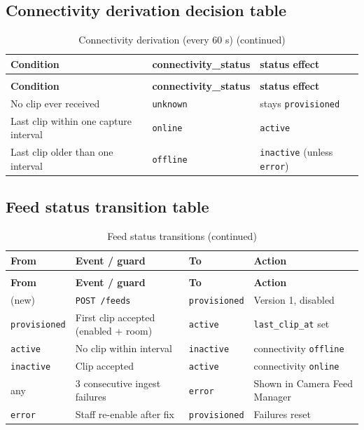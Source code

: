 \subsection{Connectivity derivation decision table}
\begin{longtable}{L{6.4cm}L{3.0cm}L{5.0cm}}
\caption{Connectivity derivation (every 60 s)}\label{tab:c1-dt-conn}\\
\toprule
\textbf{Condition} & \textbf{connectivity\_status} & \textbf{status effect} \\
\midrule
\endfirsthead
\caption[]{Connectivity derivation (every 60 s) (continued)}\\
\toprule
\textbf{Condition} & \textbf{connectivity\_status} & \textbf{status effect} \\
\midrule
\endhead
No clip ever received & \texttt{unknown} & stays \texttt{provisioned} \\
Last clip within one capture interval & \texttt{online} & \texttt{active} \\
Last clip older than one interval & \texttt{offline} & \texttt{inactive} (unless \texttt{error}) \\
\bottomrule
\end{longtable}

\subsection{Feed status transition table}
\begin{longtable}{L{2.6cm}L{5.4cm}L{2.4cm}L{4.2cm}}
\caption{Feed status transitions}\label{tab:c1-dt-state}\\
\toprule
\textbf{From} & \textbf{Event / guard} & \textbf{To} & \textbf{Action} \\
\midrule
\endfirsthead
\caption[]{Feed status transitions (continued)}\\
\toprule
\textbf{From} & \textbf{Event / guard} & \textbf{To} & \textbf{Action} \\
\midrule
\endhead
(new) & \texttt{POST /feeds} & \texttt{provisioned} & Version 1, disabled \\
\texttt{provisioned} & First clip accepted (enabled + room) & \texttt{active} & \texttt{last\_clip\_at} set \\
\texttt{active} & No clip within interval & \texttt{inactive} & connectivity \texttt{offline} \\
\texttt{inactive} & Clip accepted & \texttt{active} & connectivity \texttt{online} \\
any & 3 consecutive ingest failures & \texttt{error} & Shown in Camera Feed Manager \\
\texttt{error} & Staff re-enable after fix & \texttt{provisioned} & Failures reset \\
\bottomrule
\end{longtable}

